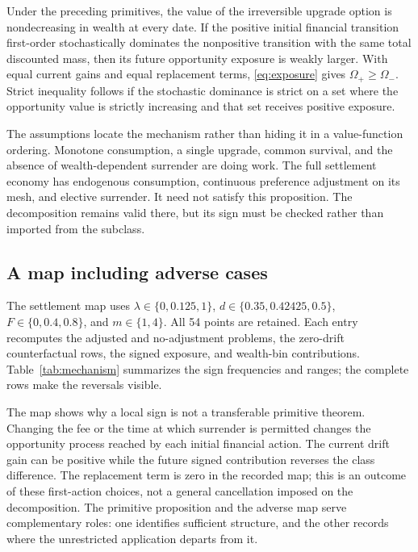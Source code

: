\begin{proposition}
\label{prop:primitive}
Under the preceding primitives, the value of the irreversible upgrade option is nondecreasing in wealth at every date. If the positive initial financial transition first-order stochastically dominates the nonpositive transition with the same total discounted mass, then its future opportunity exposure is weakly larger. With equal current gains and equal replacement terms, \eqref{eq:exposure} gives $\Omega_+\geq\Omega_-$. Strict inequality follows if the stochastic dominance is strict on a set where the opportunity value is strictly increasing and that set receives positive exposure.
\end{proposition}

The assumptions locate the mechanism rather than hiding it in a value-function ordering. Monotone consumption, a single upgrade, common survival, and the absence of wealth-dependent surrender are doing work. The full settlement economy has endogenous consumption, continuous preference adjustment on its mesh, and elective surrender. It need not satisfy this proposition. The decomposition remains valid there, but its sign must be checked rather than imported from the subclass.

\subsection{A map including adverse cases}
The settlement map uses $\lambda\in\{0,0.125,1\}$, $d\in\{0.35,0.42425,0.5\}$, $F\in\{0,0.4,0.8\}$, and $m\in\{1,4\}$. All 54 points are retained. Each entry recomputes the adjusted and no-adjustment problems, the zero-drift counterfactual rows, the signed exposure, and wealth-bin contributions. Table~\ref{tab:mechanism} summarizes the sign frequencies and ranges; the complete rows make the reversals visible.


The map shows why a local sign is not a transferable primitive theorem. Changing the fee or the time at which surrender is permitted changes the opportunity process reached by each initial financial action. The current drift gain can be positive while the future signed contribution reverses the class difference. The replacement term is zero in the recorded map; this is an outcome of these first-action choices, not a general cancellation imposed on the decomposition. The primitive proposition and the adverse map serve complementary roles: one identifies sufficient structure, and the other records where the unrestricted application departs from it.

